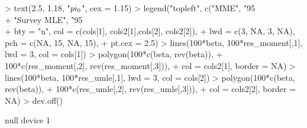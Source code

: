 \documentclass{article}
\begin{document}
\begin{Schunk}
\begin{Sinput}
> text(2.5, 1.18, "$\\pi_0$", cex = 1.15)
> legend("topleft", c("MME", "95\\% CI",
+                      "Survey MLE", "95\\% CI"),
+        bty = "n", col = c(cols[1], cols2[1],cols[2], cols2[2]),
+        lwd = c(3, NA, 3, NA), pch = c(NA, 15, NA, 15),
+        pt.cex = 2.5)
> lines(100*beta, 100*res_moment[,1], lwd = 3, col = cols[1])
> polygon(100*c(beta, rev(beta)),
+         100*c(res_moment[,2], rev(res_moment[,3])),
+         col = cols2[1], border = NA)
> lines(100*beta, 100*res_umle[,1], lwd = 3, col = cols[2])
> polygon(100*c(beta, rev(beta)),
+         100*c(res_umle[,2], rev(res_umle[,3])),
+         col = cols2[2], border = NA)
> dev.off()
\end{Sinput}
\begin{Soutput}
null device 
          1 
\end{Soutput}
\end{Schunk}
\end{document}
